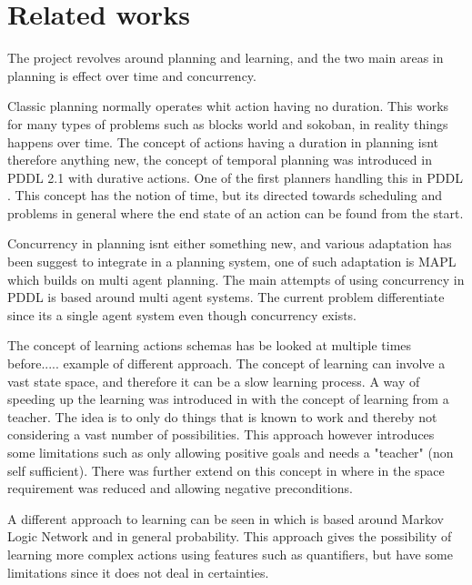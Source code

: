 \section{Related works}
The project revolves around planning and learning, and the two main areas in planning is effect over time and concurrency. 

Classic planning normally operates whit action having no duration. This works for many types of problems such as blocks world and sokoban, in reality things happens over time. The concept of actions having a duration in planning isnt therefore anything new, the concept of temporal planning was introduced in PDDL 2.1 with durative actions. One of the first planners handling this in PDDL \cite{durative}. This concept has the notion of time, but its directed towards scheduling and problems in general where the end state of an action can be found from the start.
%
%	
%
%	
%	




Concurrency in planning isnt either something new, and various adaptation has been suggest to integrate in a planning system, one of such adaptation is MAPL which builds on multi agent planning\cite{mapl}. The main attempts of using concurrency in PDDL is based around multi agent systems. The current problem differentiate since its a single agent system even though concurrency exists. 

The concept of learning actions schemas has be looked at multiple times before..... example of different approach.
The concept of learning can involve a vast state space, and therefore it can be a slow learning process. A way of speeding up the learning was introduced in \cite{Action-Schemas} with the concept of learning from a teacher. The idea is to only do things that is known to work and thereby not considering a vast number of possibilities. This approach however introduces some limitations such as only allowing positive goals and needs a "teacher" (non self sufficient). There was further extend on this concept in \cite{jacobsen2015a} where in the space requirement was reduced and allowing negative preconditions.

A different approach to learning can be seen in \cite{zhuo2010a} which is based around Markov Logic Network and in general probability. This approach gives the possibility of learning more complex actions using features such as quantifiers, but have some limitations since it does not deal in certainties.
